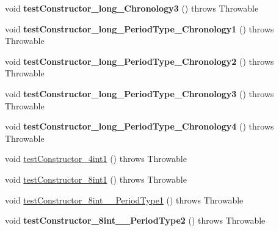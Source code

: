 \begin{DoxyCompactItemize}
\item 
\hypertarget{classorg_1_1joda_1_1time_1_1_test_period___constructors_a3bd9148fa1ef5004a72007a1ba00f3a2}{void {\bfseries test\-Constructor\-\_\-long\-\_\-\-Chronology3} ()  throws Throwable }\label{classorg_1_1joda_1_1time_1_1_test_period___constructors_a3bd9148fa1ef5004a72007a1ba00f3a2}

\item 
\hypertarget{classorg_1_1joda_1_1time_1_1_test_period___constructors_a807fffb63e35ee54bed269ed9fde08a3}{void {\bfseries test\-Constructor\-\_\-long\-\_\-\-Period\-Type\-\_\-\-Chronology1} ()  throws Throwable }\label{classorg_1_1joda_1_1time_1_1_test_period___constructors_a807fffb63e35ee54bed269ed9fde08a3}

\item 
\hypertarget{classorg_1_1joda_1_1time_1_1_test_period___constructors_ac34fe6c5641236e1fef432fafb8f4422}{void {\bfseries test\-Constructor\-\_\-long\-\_\-\-Period\-Type\-\_\-\-Chronology2} ()  throws Throwable }\label{classorg_1_1joda_1_1time_1_1_test_period___constructors_ac34fe6c5641236e1fef432fafb8f4422}

\item 
\hypertarget{classorg_1_1joda_1_1time_1_1_test_period___constructors_acd4f3b2513c5f6338d77670ffb0e2300}{void {\bfseries test\-Constructor\-\_\-long\-\_\-\-Period\-Type\-\_\-\-Chronology3} ()  throws Throwable }\label{classorg_1_1joda_1_1time_1_1_test_period___constructors_acd4f3b2513c5f6338d77670ffb0e2300}

\item 
\hypertarget{classorg_1_1joda_1_1time_1_1_test_period___constructors_a9cf86c2a43439485d5e65fec84e90399}{void {\bfseries test\-Constructor\-\_\-long\-\_\-\-Period\-Type\-\_\-\-Chronology4} ()  throws Throwable }\label{classorg_1_1joda_1_1time_1_1_test_period___constructors_a9cf86c2a43439485d5e65fec84e90399}

\item 
void \hyperlink{classorg_1_1joda_1_1time_1_1_test_period___constructors_ac525d805a056f220b30af1e00336d509}{test\-Constructor\-\_\-4int1} ()  throws Throwable 
\item 
void \hyperlink{classorg_1_1joda_1_1time_1_1_test_period___constructors_a16e9955be484323c378fc2d74062a5cf}{test\-Constructor\-\_\-8int1} ()  throws Throwable 
\item 
void \hyperlink{classorg_1_1joda_1_1time_1_1_test_period___constructors_ad753bdad01a6f73e0e2a7415b4f36bce}{test\-Constructor\-\_\-8int\-\_\-\-\_\-\-Period\-Type1} ()  throws Throwable 
\item 
\hypertarget{classorg_1_1joda_1_1time_1_1_test_period___constructors_af1125828e725b99055aa03990ff0572d}{void {\bfseries test\-Constructor\-\_\-8int\-\_\-\-\_\-\-Period\-Type2} ()  throws Throwable }\label{classorg_1_1joda_1_1time_1_1_test_period___constructors_af1125828e725b99055aa03990ff0572d}


\end{DoxyCompactItemize}
